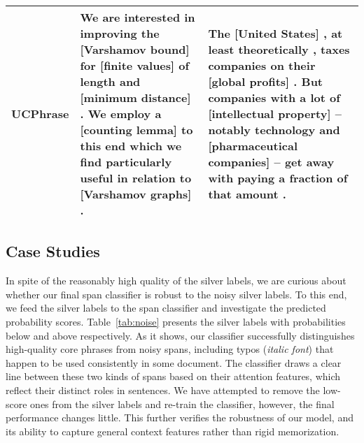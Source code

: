 \documentclass[sigconf]{acmart}
\newcommand{\our}{\mbox{UCPhrase}\xspace}
\newcommand{\catag}[1]{\textcolor{ggreen}{[\textbf{#1}]}}
\begin{document}
\begin{table*}[t]
{\begin{tabular}{@{}r@{\hskip 1em}p{}@{\hskip 2em}p{}@{}}
            \\
            \textbf{\our}
            &
            We are interested in improving the \catag{Varshamov bound} for \catag{finite values} of length  and \catag{minimum distance} . We employ a \catag{counting lemma} to this end which we find particularly useful in relation to \catag{Varshamov graphs} .
            &
            The \catag{United States} , at least theoretically , taxes companies on their \catag{global profits} .
            But companies with a lot of \catag{intellectual property} -- notably technology and \catag{pharmaceutical companies} -- get away with paying a fraction of that amount .
            \\
            
            
            
            \bottomrule
        \end{tabular}
        }
    \vspace{-3mm}
\end{table*} \subsection{Case Studies}
\label{sec:case_study}

In spite of the reasonably high quality of the silver labels, we are curious about whether our final span classifier is robust to the noisy silver labels.
To this end, we feed the silver labels to the span classifier and investigate the predicted probability scores.
Table~\ref{tab:noise} presents the silver labels with probabilities below  and above  respectively.
As it shows, our classifier successfully distinguishes high-quality core phrases from noisy spans, including typos (\emph{italic font}) that happen to be used consistently in some document.
The classifier draws a clear line between these two kinds of spans based on their attention features, which reflect their distinct roles in sentences.
We have attempted to remove the low-score ones from the silver labels and re-train the classifier, however, the final performance changes little.
This further verifies the robustness of our model, and its ability to capture general context features rather than rigid memorization.
\end{document}
